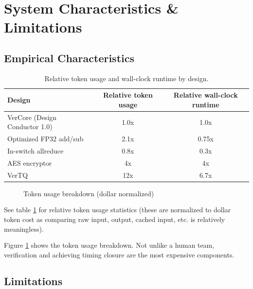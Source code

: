 \section{System Characteristics \& Limitations}
\label{sec:results}

\subsection{Empirical Characteristics}

\begin{table}[t]
	\centering
	\begin{tabular}{lcc}
		\hline
		\textbf{Design} & \textbf{Relative token usage} & \textbf{Relative wall-clock runtime} \\
		\hline
		VerCore (Design Conductor 1.0) & 1.0x & 1.0x \\
		Optimized FP32 add/sub & 2.1x & 0.75x \\
		In-switch allreduce & 0.8x & 0.3x \\
		AES encryptor & 4x & 4x \\
		VerTQ & 12x & 6.7x \\
		\hline
	\end{tabular}
	\caption{Relative token usage and wall-clock runtime by design.}
	\label{tab:relative-usage-runtime}
\end{table}

\begin{figure}
	\centering
	\caption{Token usage breakdown (dollar normalized)}
	\label{fig:tok_breakdown}
\end{figure}

See table \ref{tab:relative-usage-runtime} for relative token usage statistics (these are normalized to dollar token cost as comparing raw input, output, cached input, etc. is relatively meaningless).

Figure \ref{fig:tok_breakdown} shows the token usage breakdown. Not unlike a human team, verification and achieving timing closure are the most expensive components.

\subsection{Limitations}

